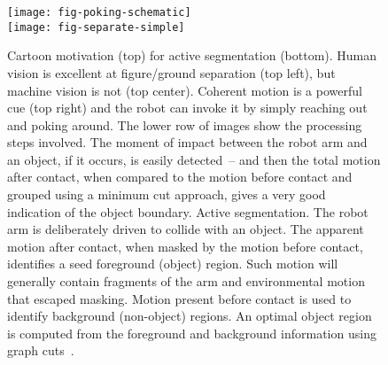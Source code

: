 \begin{figure}[bt]
\texttt{[image: fig-poking-schematic]}\\
\texttt{[image: fig-separate-simple]}
\caption
{
\label{fig:separate-simple}
%
Cartoon motivation (top) for active segmentation (bottom).
Human vision is excellent at figure/ground separation (top left),
but machine vision is not (top center).  Coherent motion is a 
powerful cue (top right) and the robot can invoke it by 
simply reaching out and poking around.  
The lower row of images
show the processing steps involved.  The moment of impact between
the robot arm and an object, if it occurs, is
easily detected~-- and then
the total motion after contact, when compared to the motion before
contact and grouped using a minimum cut approach, gives a very
good indication of the object boundary. %
Active segmentation.  The robot arm is deliberately driven
to collide with an object.
 The
apparent motion after contact, when masked by the motion before
contact, identifies a seed foreground (object) region.  Such motion
will generally contain fragments of the arm and environmental motion
that escaped masking.  Motion present before contact is used to
identify background (non-object) regions.  
An optimal object region is computed from the foreground and
background information using graph cuts~\citep{boykov01experimental}.
%
%
}
\end{figure}


